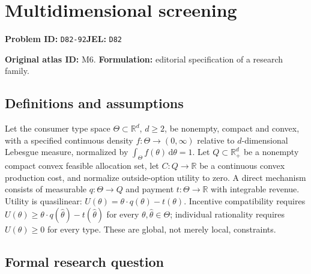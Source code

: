 \documentclass[11pt,a4paper]{article}
\begin{document}
\section*{Multidimensional screening}
\textbf{Problem ID:} \texttt{D82-92}\quad \textbf{JEL:} \texttt{D82}\par
\label{problem:OP-0006}
\label{atlas:prob:M6}

\noindent\textbf{Original atlas ID:} M6. \textbf{Formulation:} editorial specification of a research family.

\subsection*{Definitions and assumptions}

Let the consumer type space $\Theta\subset\mathbb R^d$, $d\ge2$, be nonempty, compact and convex, with a specified continuous density $f:\Theta\to(0,\infty)$ relative to $d$-dimensional Lebesgue measure, normalized by $\int_\Theta f(\theta)\,\mathrm d\theta=1$. Let $Q\subset\mathbb R_+^d$ be a nonempty compact convex feasible allocation set, let $C:Q\to\mathbb R$ be a continuous convex production cost, and normalize outside-option utility to zero. A direct mechanism consists of measurable $q:\Theta\to Q$ and payment $t:\Theta\to\mathbb R$ with integrable revenue. Utility is quasilinear: $U(\theta)=\theta\cdot q(\theta)-t(\theta)$. Incentive compatibility requires $U(\theta)\ge\theta\cdot q(\hat\theta)-t(\hat\theta)$ for every $\theta,\hat\theta\in\Theta$; individual rationality requires $U(\theta)\ge0$ for every type. These are global, not merely local, constraints.

\subsection*{Formal research question}
\end{document}
